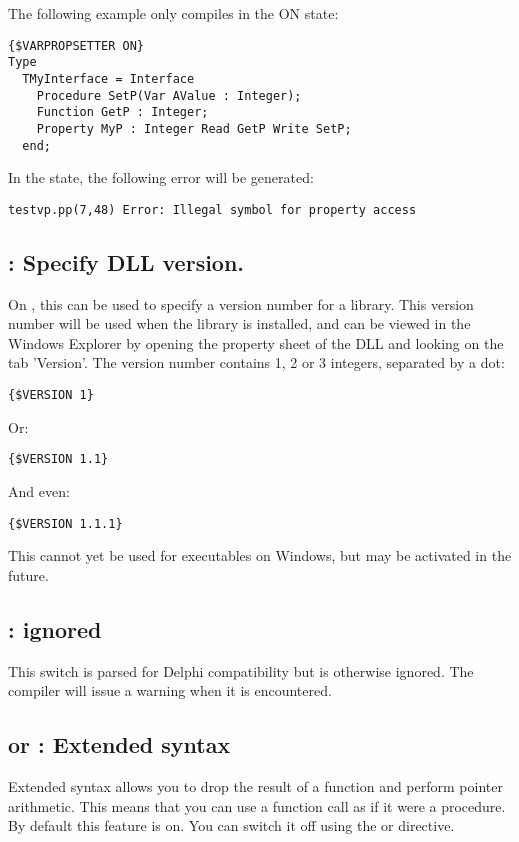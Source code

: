 The following example only compiles in the ON state:
\begin{verbatim}
{$VARPROPSETTER ON}
Type
  TMyInterface = Interface
    Procedure SetP(Var AValue : Integer);
    Function GetP : Integer;
    Property MyP : Integer Read GetP Write SetP;
  end;
\end{verbatim}
In the  state, the following error will be generated:
\begin{verbatim}
testvp.pp(7,48) Error: Illegal symbol for property access
\end{verbatim}

\subsection{ : Specify DLL version.}
On \windows, this can be used to specify a version number for a library.
This version number will be used when the library is installed, and can be
viewed in the Windows Explorer by opening the property sheet of the DLL and
looking on the tab 'Version'. 
The version number contains 1, 2 or 3 integers, separated by a dot:
\begin{verbatim}
{$VERSION 1}
\end{verbatim}
Or:
\begin{verbatim}
{$VERSION 1.1}
\end{verbatim}
And even:
\begin{verbatim}
{$VERSION 1.1.1}
\end{verbatim}
This cannot yet be used for executables on Windows, but may be activated in
the future.

\subsection{ : ignored}
This switch is parsed for Delphi compatibility but is otherwise ignored. 
The compiler will issue a warning when it is encountered.

\subsection{ or  : Extended syntax}

Extended syntax allows you to drop the result of a function and perform
pointer arithmetic. This means that
you can use a function call as if it were a procedure. By default this feature
is on. You can switch it off using the  or
directive.

